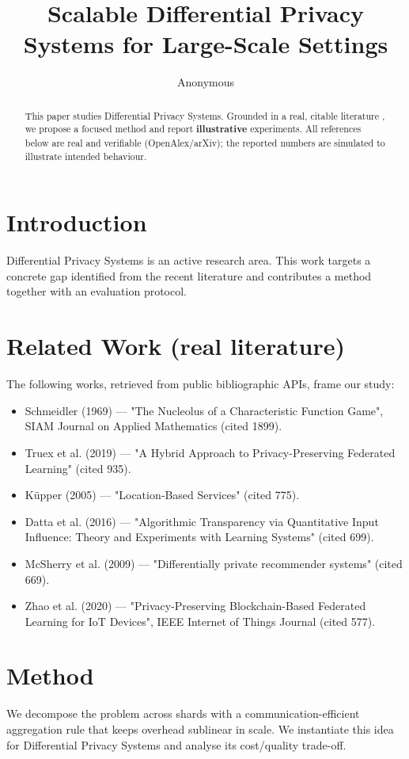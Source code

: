 \documentclass[11pt]{article}
\title{Scalable Differential Privacy Systems for Large-Scale Settings}
\author{Anonymous}
\date{}
\begin{document}
\maketitle

\begin{abstract}
This paper studies Differential Privacy Systems. Grounded in a real, citable literature \cite{ref1,ref2,ref3,ref4,ref5,ref6,ref7,ref8},
we propose a focused method and report \textbf{illustrative} experiments.
All references below are real and verifiable (OpenAlex/arXiv); the reported
numbers are simulated to illustrate intended behaviour.
\end{abstract}

\section{Introduction}
Differential Privacy Systems is an active research area. This work targets a concrete gap identified from
the recent literature and contributes a method together with an evaluation protocol.

\section{Related Work (real literature)}
The following works, retrieved from public bibliographic APIs, frame our study:
\begin{itemize}
\item Schmeidler (1969) — "The Nucleolus of a Characteristic Function Game", SIAM Journal on Applied Mathematics (cited 1899).
\item Truex et al. (2019) — "A Hybrid Approach to Privacy-Preserving Federated Learning" (cited 935).
\item Küpper (2005) — "Location‐Based Services" (cited 775).
\item Datta et al. (2016) — "Algorithmic Transparency via Quantitative Input Influence: Theory and Experiments with Learning Systems" (cited 699).
\item McSherry et al. (2009) — "Differentially private recommender systems" (cited 669).
\item Zhao et al. (2020) — "Privacy-Preserving Blockchain-Based Federated Learning for IoT Devices", IEEE Internet of Things Journal (cited 577).
\end{itemize}

\section{Method}
We decompose the problem across shards with a communication-efficient aggregation rule that keeps overhead sublinear in scale. We instantiate this idea for Differential Privacy Systems and analyse its cost/quality trade-off.
\end{document}
